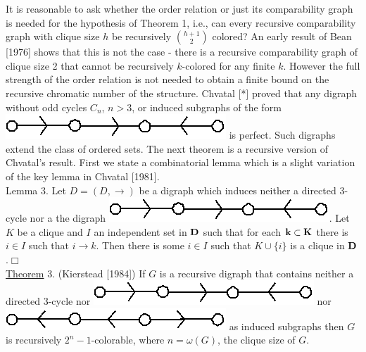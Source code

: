 \documentclass[twoside]{article}
\begin{document}
It is reasonable to ask whether the order relation or just its comparability graph is needed for the hypothesis of
Theorem 1, i.e., can every recursive comparability graph with clique size $h$ be recursively $\binom{h+1}{2}$ colored?   An early result of Bean [1976] shows that
this is not the case - there is a recursive comparability graph of clique size
2	that cannot be recursively   $k$-colored for any finite $k$.    However the full strength of the order relation is not needed to obtain a finite bound on the recursive chromatic number of the structure.    
Chvatal [*] proved that any digraph without odd cycles  $C_n$,  $n>3$, or induced subgraphs of the form \includegraphics[scale=0.25]{figures/small/1.png} is perfect.   
Such digraphs extend the class of ordered sets. 
The next theorem is a recursive version of Chvatal's result.   
First we state a combinatorial lemma which is a slight variation of the key lemma in Chvatal [1981].\\
\newline
Lemma 3.    Let   $D = (D, \rightarrow)$ be a digraph which induces neither a directed 3-cycle nor a the digraph \includegraphics[scale=0.25]{figures/small/1.png}.    
Let   $K$   be a clique and $I$ an independent set in   $\mathbf{D}$   such that for each   $\mathbf{k\subset K}$   there is  $i\in I$   such that $i\rightarrow k$. 
Then there is some $i\in I$   such that   $K\cup \{i\}$ is a clique in $\mathbf{D}$.$\Box$\\
\newline
\underline{Theorem} 3. (Kierstead [1984]) If   $G$   is a recursive digraph that contains neither a directed 3-cycle nor \includegraphics[scale=0.25]{figures/small/1.png} nor \includegraphics[scale=0.25]{figures/small/2.png} as induced
\newpage
%
%
\noindent subgraphs then $G$ is recursively $2^n-1$-colorable, where $n = \omega(G)$, the clique size of $G$.\\
\end{document}
